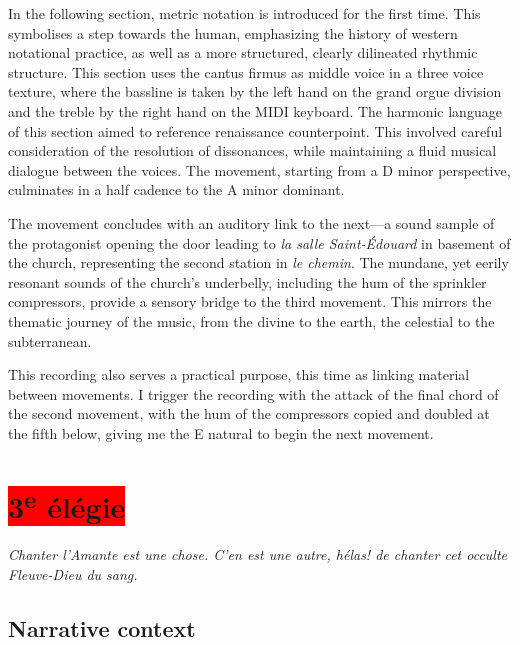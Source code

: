 \documentclass[12pt,twoside,maitrise]{dms_ks}
\theoremstyle{definition}
\begin{document}
{In the following section, metric notation is introduced for the first time.
This symbolises a step towards the human, emphasizing the history of western notational practice, as well as a more structured, clearly dilineated rhythmic structure. 
This section uses the cantus firmus as middle voice in a three voice texture, where the bassline is taken by the left hand on the grand orgue division and the treble by the right hand on the MIDI keyboard.
The harmonic language of this section aimed to reference renaissance counterpoint.
This involved careful consideration of the resolution of dissonances, while maintaining a fluid musical dialogue between the voices.
The movement, starting from a D minor perspective, culminates in a half cadence to the A minor dominant.


The movement concludes with an auditory link to the next---a sound sample of the protagonist opening the door leading to \textit{la salle Saint-Édouard} in basement of the church, representing the second station in \textit{le chemin}.
The mundane, yet eerily resonant sounds of the church's underbelly, including the hum of  the sprinkler compressors, provide a sensory bridge to the third movement.
This mirrors the thematic journey of the music, from the divine to the earth, the celestial to the subterranean.

This recording also serves a practical purpose, this time as linking material between movements. 
I trigger the recording with the attack of the final chord of the second movement, with the hum of the compressors copied and doubled at the fifth below, giving me the E natural to begin the next movement.


\section{\colorbox{red}{3\textsuperscript{e} élégie}}

\epigraph{\textit{Chanter l'Amante est une chose. C'en est une autre, hélas! de chanter cet occulte Fleuve-Dieu du sang.}}{}

\subsection{Narrative context}

}
\end{document}
